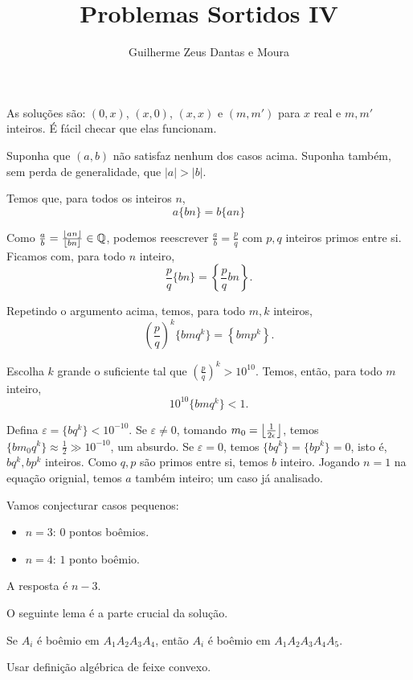 \documentclass[10pt,a4paper]{article}
\title{Problemas Sortidos IV}
\author{Guilherme Zeus Dantas e Moura}
\begin{document}
	
	\zeustitle
	
	\begin{sol}
		As soluções são: $(0, x)$, $(x, 0)$, $(x, x)$ e $(m, m')$ para $x$ real e $m, m'$ inteiros. É fácil checar que elas funcionam.

		Suponha que $(a, b)$ não satisfaz nenhum dos casos acima. Suponha também, sem perda de generalidade, que $|a| > |b|$.

		Temos que, para todos os inteiros $n$, \[
			a\{bn\} = b\{an\}
		\]

		Como $\frac{a}{b} = \frac{\left \lfloor{an}\right \rfloor}{\left \lfloor{bn}\right \rfloor} \in \mathbb{Q}$, podemos reescrever $\frac{a}{b} = \frac{p}{q}$ com $p, q$ inteiros primos entre si.
		Ficamos com, para todo $n$ inteiro, \[
			\frac{p}{q}\{bn\} = \left\{\frac{p}{q}bn\right\}.
		\]

		Repetindo o argumento acima, temos, para todo $m, k$ inteiros, \[
			\left(\frac{p}{q}\right)^k\{bmq^k\} = \left\{bmp^k\right\}.
		\]

		Escolha $k$ grande o suficiente tal que $\left(\frac{p}{q}\right)^k > 10^{10}$. Temos, então, para todo $m$ inteiro, \[
			10^{10} \{bmq^k\} < 1.
		\]

		Defina $\varepsilon = \{bq^k\} < 10^{-10}$. Se $\varepsilon \neq 0$, tomando $m_0 = \left \lfloor{\frac{1}{2\epsilon}}\right \rfloor$, temos  $\{bm_0q^k\} \approx \frac{1}{2} \gg 10^{-10}$, um absurdo. Se $\varepsilon = 0$, temos $\{bq^k\} = \{bp^k\} = 0$, isto é, $bq^k, bp^k$ inteiros. Como $q, p$ são primos entre si, temos $b$ inteiro. Jogando $n = 1$ na equação orignial, temos $a$ também inteiro; um caso já analisado.


	\end{sol}

	\begin{sk}
		Vamos conjecturar casos pequenos:
		\begin{itemize}
			\item $n = 3$: $0$ pontos boêmios.
			\item $n = 4$: $1$ ponto boêmio.
		\end{itemize}
		\begin{conj}
			A resposta é $n-3$.
		\end{conj}

		O seguinte lema é a parte crucial da solução.

		\begin{lem}
			Se $A_i$ é boêmio em $A_1A_2A_3A_4$, então $A_i$ é boêmio em $A_1A_2A_3A_4A_5$.
		\end{lem}
		\begin{sk}
			Usar definição algébrica de feixe convexo.
		\end{sk}
	\end{sk}
\end{document}
